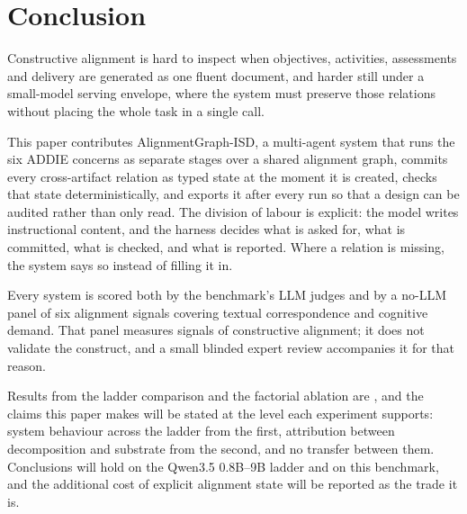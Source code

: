 \section{Conclusion}
\label{sec:conclusion}

Constructive alignment is hard to inspect when objectives, activities, assessments
and delivery are generated as one fluent document, and harder still under a
small-model serving envelope, where the system must preserve those relations without
placing the whole task in a single call.

This paper contributes AlignmentGraph-ISD, a multi-agent system that runs the six
ADDIE concerns as separate stages over a shared alignment graph, commits every
cross-artifact relation as typed state at the moment it is created, checks that state
deterministically, and exports it after every run so that a design can be audited
rather than only read. The division of labour is explicit: the model writes
instructional content, and the harness decides what is asked for, what is committed,
what is checked, and what is reported. Where a relation is missing, the system says
so instead of filling it in.

Every system is scored both by the benchmark's LLM judges and by a no-LLM panel of
six alignment signals covering textual correspondence and cognitive demand. That panel
measures signals of constructive alignment; it does not validate the construct, and a
small blinded expert review accompanies it for that reason.

Results from the ladder comparison and the factorial ablation are \TBD{}, and the
claims this paper makes will be stated at the level each experiment supports: system
behaviour across the ladder from the first, attribution between decomposition and
substrate from the second, and no transfer between them. Conclusions will hold on the
Qwen3.5 0.8B--9B ladder and on this benchmark, and the additional cost of explicit
alignment state will be reported as the trade it is.
